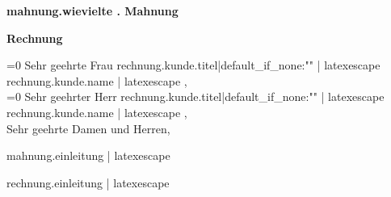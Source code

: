 \documentclass[a4paper,12pt,top=1.5cm,bottom=1.5cm]{article}
\begin{document}
    {%
        \large{\bf {{ mahnung.wievielte }}. Mahnung}\\[3ex]
    {%
        \large{\bf Rechnung}\\[3ex]
    {%

    \normalsize
    \ifnum{}=0
        Sehr geehrte Frau {{ rechnung.kunde.titel|default_if_none:"" | latexescape }} {{ rechnung.kunde.name | latexescape }},\\[2ex]
    \else
        \ifnum{}=0
            Sehr geehrter Herr {{ rechnung.kunde.titel|default_if_none:"" | latexescape }} {{ rechnung.kunde.name | latexescape }},\\[2ex]
        \else
            Sehr geehrte Damen und Herren,\\[2ex]
        \fi
    \fi

    {%
        {{ mahnung.einleitung | latexescape }} \ \\[3ex]
    {%
        {{ rechnung.einleitung | latexescape }} \ \\[3ex]
    {%

}}}}}}
\end{document}
